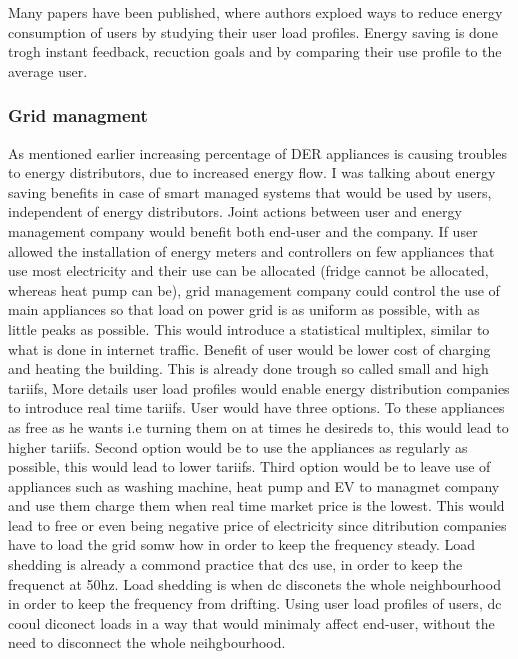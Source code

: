\documentclass[
11pt, %
english, %
singlespacing, %
headsepline, %
]{MastersDoctoralThesis} %
\begin{document}
Many papers have been published, where authors exploed ways to reduce energy consumption of users by studying their user load profiles.
Energy saving is done trogh instant feedback, recuction goals  and by comparing their use profile to the average user.

\subsubsection{Grid managment}

As mentioned earlier increasing percentage of DER appliances is causing troubles to energy distributors, 
due to increased energy flow. I was talking about energy saving benefits in case of smart managed systems
that would be used by users, independent of energy distributors. Joint actions between user and energy management company
would benefit both end-user and the company. If user allowed the installation of energy meters and controllers 
on few appliances that use most electricity and their use can be allocated (fridge cannot be allocated, whereas heat pump can be),
grid management company could control the use of main appliances so that load on power grid is as uniform as possible,
with as little peaks as possible. This would introduce a statistical multiplex, similar to what is done in internet traffic. 
Benefit of user would be lower cost of charging and heating the building. This is already done trough so called small and high tariifs,
More details user load profiles would enable energy distribution companies to introduce real time tariifs.
User would have three options. To these appliances as free as he wants i.e turning them on at times he desireds to, this would lead
to higher tariifs. Second option would be to use the appliances as regularly as possible, this would lead to lower tariifs.
Third option would be to leave use of appliances such as washing machine, heat pump and EV to managmet company and use them
charge them when real time market price is the lowest. This would lead to free or even being negative price of electricity since
ditribution companies have to load the grid somw how in order to keep the frequency steady. Load shedding is already a commond practice that dcs use,
in order to keep the frequenct at 50hz. Load shedding is when dc disconets the whole neighbourhood in order to keep the frequency from drifting. 
Using user load profiles of users, dc cooul diconect loads in a way that would minimaly affect end-user, without the need to disconnect the whole neihgbourhood. 
\end{document}
